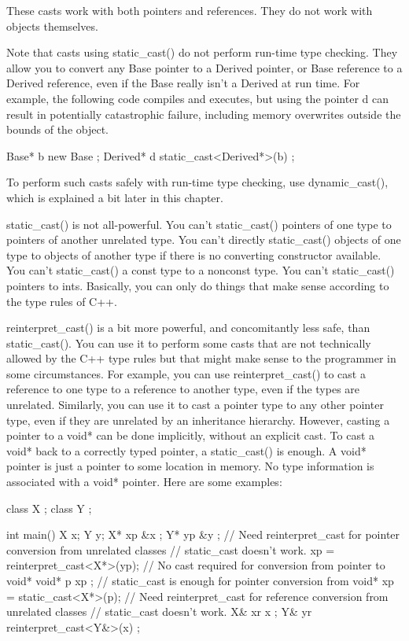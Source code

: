 These casts work with both pointers and references. They do not work with objects themselves.

Note that casts using static\_cast() do not perform run-time type checking. They allow you to convert any Base pointer to a Derived pointer, or Base reference to a Derived reference, even if the Base really isn’t a Derived at run time. For example, the following code compiles and executes, but using the pointer d can result in potentially catastrophic failure, including memory overwrites outside the bounds of the object.

\begin{cpp}
Base* b { new Base {} };
Derived* d { static_cast<Derived*>(b) };
\end{cpp}

To perform such casts safely with run-time type checking, use dynamic\_cast(), which is explained a bit later in this chapter.

static\_cast() is not all-powerful. You can’t static\_cast() pointers of one type to pointers of another unrelated type. You can’t directly static\_cast() objects of one type to objects of another type if there is no converting constructor available. You can’t static\_cast() a const type to a nonconst type. You can’t static\_cast() pointers to ints. Basically, you can only do things that make sense according to the type rules of C++.


reinterpret\_cast() is a bit more powerful, and concomitantly less safe, than static\_cast(). You can use it to perform some casts that are not technically allowed by the C++ type rules but that might make sense to the programmer in some circumstances. For example, you can use reinterpret\_cast() to cast a reference to one type to a reference to another type, even if the types are unrelated. Similarly, you can use it to cast a pointer type to any other pointer type, even if they are unrelated by an inheritance hierarchy. However, casting a pointer to a void* can be done implicitly, without an explicit cast. To cast a void* back to a correctly typed pointer, a static\_cast() is enough. A void* pointer is just a pointer to some location in memory. No type information is associated with a void* pointer. Here are some examples:

\begin{cpp}
class X {};
class Y {};

int main()
{
    X x;
    Y y;
    X* xp { &x };
    Y* yp { &y };
    // Need reinterpret_cast for pointer conversion from unrelated classes
    // static_cast doesn't work.
    xp = reinterpret_cast<X*>(yp);
    // No cast required for conversion from pointer to void*
    void* p { xp };
    // static_cast is enough for pointer conversion from void*
    xp = static_cast<X*>(p);
    // Need reinterpret_cast for reference conversion from unrelated classes
    // static_cast doesn't work.
    X& xr { x };
    Y& yr { reinterpret_cast<Y&>(x) };
}
\end{cpp}

